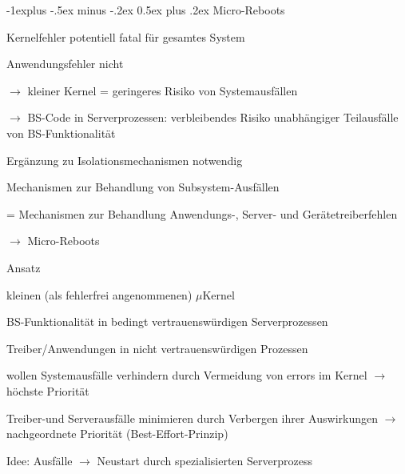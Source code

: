 \documentclass[a4paper]{article}
\makeatletter
\renewcommand{\subsection}{\@startsection{subsection}{2}{0mm}%
 {-1explus -.5ex minus -.2ex}%
 {0.5ex plus .2ex}%
 {\normalfont\normalsize\bfseries}}
\makeatother
\begin{document}
\begin{multicols}{3}
    \subsection{Micro-Reboots}
    \begin{itemize*}
        \item Kernelfehler potentiell fatal für gesamtes System
        \item Anwendungsfehler nicht
        \item[$\rightarrow$] kleiner Kernel = geringeres Risiko von Systemausfällen
        \item[$\rightarrow$] BS-Code in Serverprozessen: verbleibendes Risiko unabhängiger Teilausfälle von BS-Funktionalität
        \item Ergänzung zu Isolationsmechanismen notwendig
        \item Mechanismen zur Behandlung von Subsystem-Ausfällen
        \item[=] Mechanismen zur Behandlung Anwendungs-, Server- und Gerätetreiberfehlen
        \item[$\rightarrow$] Micro-Reboots
    \end{itemize*}

    Ansatz
    \begin{itemize*}
        \item kleinen (als fehlerfrei angenommenen) $\mu$Kernel
        \item BS-Funktionalität in bedingt vertrauenswürdigen Serverprozessen %
        \item Treiber/Anwendungen in nicht vertrauenswürdigen Prozessen %
        \item wollen Systemausfälle verhindern durch Vermeidung von errors im Kernel $\rightarrow$ höchste Priorität
        \item Treiber-und Serverausfälle minimieren durch Verbergen ihrer Auswirkungen $\rightarrow$ nachgeordnete Priorität (Best-Effort-Prinzip)
        \item Idee: Ausfälle $\rightarrow$ Neustart durch spezialisierten Serverprozess
    \end{itemize*}



\end{multicols}
\end{document}
